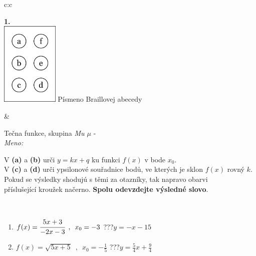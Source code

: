 \documentclass[10pt]{report}
\begin{document}
\begin{tabular}{c:c}
\begin{minipage}[c][104.5mm][t]{0.5\linewidth}
\begin{center}
\begin{minipage}{0.20\linewidth}
\begin{center}
{\Huge\bfseries 1.} \\[2mm]
\includegraphics[height=40mm]{../images/braille.png}
{\small Písmeno Braillovej abecedy}
\end{center}
\end{minipage}
\end{center}
\end{minipage}
&
\begin{minipage}[c][104.5mm][t]{0.5\linewidth}
\begin{center}
\vspace{7mm}
{\huge Tečna funkce, skupina \textit{Mu $\mu$} -}\\[5mm]
\textit{Meno:}\phantom{xxxxxxxxxxxxxxxxxxxxxxxxxxxxxxxxxxxxxxxxxxxxxxxxxxxxxxxxxxxxxxxxx}\\[5mm]
\begin{minipage}{0.95\linewidth}
\begin{center}
V \textbf{(a)} a \textbf{(b)} urči  $y = kx + q$ ku funkci $f(x)$ v bode $x_0$.\\V \textbf{(c)} a \textbf{(d)} urči ypsilonové souřadnice bodů, ve kterých je sklon $f(x)$ rovný $k$.\\Pokud se výsledky shodujú s těmi za otazníky, tak napravo obarvi\\příslušející kroužek načerno. \textbf{Spolu odevzdejte výsledné slovo}.
\end{center}
\end{minipage}
\\[1mm]
\begin{minipage}{0.79\linewidth}
\begin{center}
\begin{varwidth}{\linewidth}
\begin{enumerate}
\small
\item $f(x)=\cfrac{5x+3}{-2x-3}\enspace , \enspace x_0=-3$\quad \dotfill\; ???\;\dotfill \quad $y = -x-15$
\item $f(x)=\sqrt{5x+5}\enspace , \enspace x_0=-\frac{1}{5}$\quad \dotfill\; ???\;\dotfill \quad $y = \frac{5}{4}x+\frac{9}{4}$

\end{enumerate}
\end{varwidth}
\end{center}
\end{minipage}
\end{center}
\end{minipage}
\end{tabular}
\end{document}
